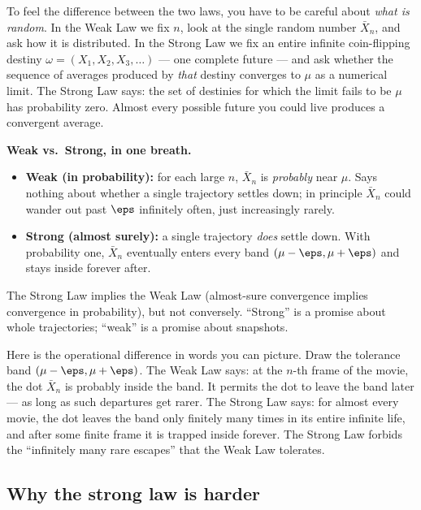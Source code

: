 To feel the difference between the two laws, you have to be careful about \emph{what is random}. In the Weak Law we fix $n$, look at the single random number $\bar X_n$, and ask how it is distributed. In the Strong Law we fix an entire infinite coin-flipping destiny $\omega = (X_1, X_2, X_3, \dots)$ --- one complete future --- and ask whether the sequence of averages produced by \emph{that} destiny converges to $\mu$ as a numerical limit. The Strong Law says: the set of destinies for which the limit fails to be $\mu$ has probability zero. Almost every possible future you could live produces a convergent average.

\begin{focusbox}
\textbf{Weak vs.\ Strong, in one breath.}
\begin{itemize}
  \item \textbf{Weak (in probability):} for each large $n$, $\bar X_n$ is \emph{probably} near $\mu$. Says nothing about whether a single trajectory settles down; in principle $\bar X_n$ could wander out past $\eps$ infinitely often, just increasingly rarely.
  \item \textbf{Strong (almost surely):} a single trajectory \emph{does} settle down. With probability one, $\bar X_n$ eventually enters every band $(\mu-\eps, \mu+\eps)$ and stays inside forever after.
\end{itemize}
The Strong Law implies the Weak Law (almost-sure convergence implies convergence in probability), but not conversely. ``Strong'' is a promise about whole trajectories; ``weak'' is a promise about snapshots.
\end{focusbox}

\begin{happeningbox}
Here is the operational difference in words you can picture. Draw the tolerance band $(\mu-\eps,\mu+\eps)$. The Weak Law says: at the $n$-th frame of the movie, the dot $\bar X_n$ is probably inside the band. It permits the dot to leave the band later --- as long as such departures get rarer. The Strong Law says: for almost every movie, the dot leaves the band only finitely many times in its entire infinite life, and after some finite frame it is trapped inside forever. The Strong Law forbids the ``infinitely many rare escapes'' that the Weak Law tolerates.
\end{happeningbox}

\subsection{Why the strong law is harder}

